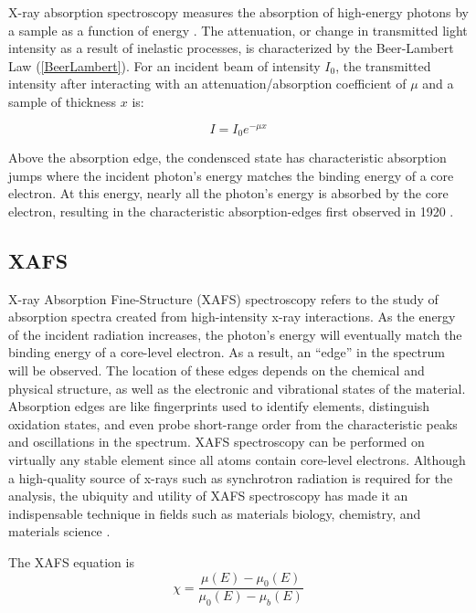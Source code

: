 X-ray absorption spectroscopy measures the absorption of high-energy photons by a sample as a function of energy \cite{gardenghi2012synchrotron}. The attenuation, or change in transmitted light intensity as a result of inelastic processes, is characterized by the Beer-Lambert Law (\ref{BeerLambert}). For an incident beam of intensity $I_0$, the transmitted intensity after interacting with an  attenuation/absorption 
coefficient of $ \mu $ and a sample of thickness $ x $ is: 

\begin{equation}
    \label{BeerLambert}
    I = I_0 e^{-\mu x}
\end{equation}

Above the absorption edge, the condensced state has characteristic absorption jumps where the incident photon's energy matches the binding energy of a core electron. At this energy, nearly all the photon's energy is absorbed by the core electron, resulting in the characteristic absorption-edges first observed in 1920 \cite{fricke1920, hertz1920ueber}.



\subsection{XAFS}
X-ray Absorption Fine-Structure (XAFS) spectroscopy refers to the study of absorption spectra created from high-intensity x-ray interactions. As the energy of the incident radiation increases, the photon's energy will eventually match the binding energy of a core-level electron. As a result, an ``edge'' in the spectrum will be observed. The location of these edges depends on the chemical and physical structure, as well as the electronic and vibrational states of the material. Absorption edges are like fingerprints used to identify elements, distinguish oxidation states, and even probe short-range order from the characteristic peaks and oscillations in the spectrum. XAFS spectroscopy can be performed on virtually any stable element since all atoms contain core-level electrons. Although a high-quality source of x-rays such as synchrotron radiation is required for the analysis, the ubiquity and utility of XAFS spectroscopy has made it an indispensable technique in fields such as materials biology, chemistry, and materials science \cite{rehrXAFS2000review} \cite{newville2014fundamentals}.

The XAFS equation is 
\begin{equation}
    \label{XAFS}
    \chi = \dfrac{ \mu(E)- \mu_{0}(E)  }{  \mu_{0}(E) - \mu_{ b  }(E)  } 
\end{equation}

